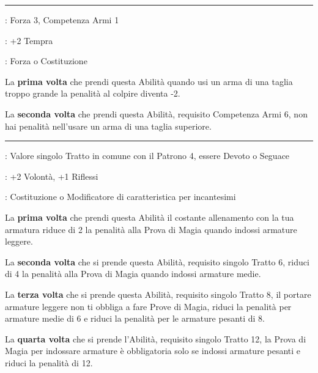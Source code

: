 \begin{multicols}{2}
\smallskip\noindent\rule{\linewidth}{2pt} \hypertarget{Armato}{}\medskip{}
\noindent
\begin{description}[noitemsep, topsep=0pt, parsep=0pt, partopsep=0pt, leftmargin=0cm, labelwidth=2.5cm]
    \item[\textbf{Requisito}]: Forza 3, Competenza Armi 1
    \item[\textbf{Tiri Salvezza}]: +2 Tempra
    \item[\textbf{Caratteristica}]: Forza o Costituzione
\end{description}

La \textbf{prima volta} che prendi questa Abilità quando usi un arma di una taglia troppo grande la penalità al colpire diventa -2.

La \textbf{seconda volta} che prendi questa Abilità, requisito Competenza Armi 6, non hai penalità nell'usare un arma di una taglia superiore.

\smallskip\noindent\rule{\linewidth}{2pt} \hypertarget{Armatura del Devoto}{}\medskip{}
\noindent
\begin{description}[noitemsep, topsep=0pt, parsep=0pt, partopsep=0pt, leftmargin=0cm, labelwidth=2.5cm]
    \item[\textbf{Requisito}]: Valore singolo Tratto in comune con il Patrono 4, essere Devoto o Seguace
    \item[\textbf{Tiri Salvezza}]: +2 Volontà, +1 Riflessi
    \item[\textbf{Caratteristica}]: Costituzione o Modificatore di caratteristica per incantesimi
\end{description}

La \textbf{prima volta} che prendi questa Abilità il costante allenamento con la tua armatura riduce di 2 la penalità alla Prova di Magia quando indossi armature leggere.

La \textbf{seconda volta} che si prende questa Abilità, requisito singolo Tratto 6, riduci di 4 la penalità alla Prova di Magia quando indossi armature medie.

La \textbf{terza volta} che si prende questa Abilità, requisito singolo Tratto 8, il portare armature leggere non ti obbliga a fare Prove di Magia, riduci la penalità per armature medie di 6 e riduci la penalità per le armature pesanti di 8.

La \textbf{quarta volta} che si prende l'Abilità, requisito singolo Tratto 12, la Prova di Magia per indossare armature è obbligatoria solo se indossi armature pesanti e riduci la penalità di 12.


\end{multicols}

